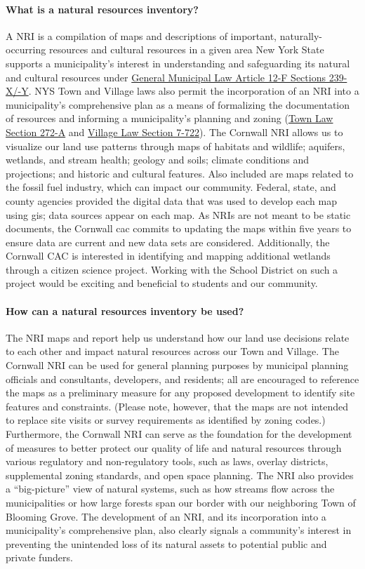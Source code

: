 \paragraph{What is a natural resources inventory?} A NRI is a compilation of 
maps and descriptions of important, naturally-occurring resources and cultural 
resources in a given area New York State supports a municipality’s interest in 
understanding and safeguarding its natural and cultural resources under 
\href{https://www.nysenate.gov/legislation/laws/GMU/239-X}{General Municipal Law 
Article 12-F Sections 239-X/-Y}. NYS Town and Village laws also permit the 
incorporation of an NRI into a municipality’s comprehensive plan as a means of 
formalizing the documentation of resources and informing a municipality’s 
planning and zoning 
(\href{https://www.nysenate.gov/legislation/laws/TWN/272-A}{Town Law Section 
272-A} and \href{https://www.nysenate.gov/legislation/laws/VIL/7-722}{Village 
Law Section 7-722}). The Cornwall NRI allows us to visualize our land use 
patterns through maps of habitats and wildlife; aquifers, wetlands, and stream 
health; geology and soils; climate conditions and projections; and historic and 
cultural features. Also included are maps related to the fossil fuel industry, 
which can impact our community. Federal, state, and county agencies provided the 
digital data that was used to develop each map using \gls{gis}; data sources 
appear on each map. As NRIs are not meant to be static documents, the Cornwall 
\gls{cac} commits to updating the maps within five years to ensure data are 
current and new data sets are considered. Additionally, the Cornwall CAC is 
interested in identifying and mapping additional wetlands through a citizen 
science project. Working with the School District on such a project would be 
exciting and beneficial to students and our community.
\paragraph{How can a natural resources inventory be used?} The NRI maps and 
report help us understand how our land use decisions relate to each other and 
impact natural resources across our Town and Village. The Cornwall NRI can 
be used for general planning purposes by municipal planning officials and 
consultants, developers, and residents; all are encouraged to reference the 
maps as a preliminary measure for any proposed development to identify site 
features and constraints. (Please note, however, that the maps are not intended 
to replace site visits or survey requirements as identified by zoning codes.) 
Furthermore, the Cornwall NRI can serve as the foundation for the 
development of measures to better protect our quality of life and natural 
resources through various regulatory and non-regulatory tools, such as laws, 
overlay districts, supplemental zoning standards, and open space planning. The 
NRI also provides a “big-picture” view of natural systems, such as how 
streams flow across the municipalities or how large forests span our border 
with our neighboring Town of Blooming Grove. The development of an NRI, and 
its incorporation into a municipality's comprehensive plan, also clearly 
signals a community's interest in preventing the unintended loss of its natural 
assets to potential public and private funders.
